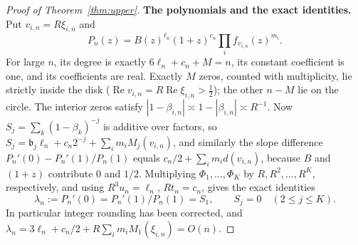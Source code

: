 \documentclass[11pt]{article}
\theoremstyle{remark}\newtheorem{remark}[theorem]{Remark}
\newcommand{\Rea}{\operatorname{Re}}
\begin{document}
\begin{proof}[Proof of Theorem~\ref{thm:upper}]
\textbf{The polynomials and the exact identities.}
Put \(v_{i,n}=R\xi_{i,n}\) and
\[
 P_n(z)=B(z)^{\ell_n}(1+z)^{c_n}\prod_i f_{v_{i,n}}(z)^{m_i}.
\]
For large \(n\), its degree is exactly \(6\ell_n+c_n+M=n\), its constant
coefficient is one, and its coefficients are real. Exactly \(M\)
zeros, counted with multiplicity, lie strictly inside the disk
(\(\Rea v_{i,n}=R\Rea\xi_{i,n}>\frac12\));
the other \(n-M\) lie on the circle. The interior zeros satisfy
\(|1-\beta_{i,n}|\asymp1-|\beta_{i,n}|\asymp R^{-1}\).
Now \(S_j=\sum_k(1-\beta_k)^{-j}\) is additive over factors, so
\(S_j=\mathfrak b_j\ell_n+c_n2^{-j}+\sum_im_iM_j(v_{i,n})\), and similarly the
slope difference \(P_n'(0)-P_n'(1)/P_n(1)\) equals
\(c_n/2+\sum_im_id(v_{i,n})\), because \(B\) and \((1+z)\) contribute
\(0\) and \(1/2\). Multiplying \(\Phi_1,\ldots,\Phi_K\) by
\(R,R^2,\ldots,R^K\), respectively, and using \(R^3u_n=\ell_n\),
\(Rt_n=c_n\), gives the exact identities
\[
 \lambda_n:=P_n'(0)=P_n'(1)/P_n(1)=S_1,\qquad
 S_j=0\quad(2\le j\le K).
\]
In particular integer rounding has been corrected, and
\(\lambda_n=3\ell_n+c_n/2+R\sum_i m_iM_1(\xi_{i,n})=O(n)\).


\end{proof}
\end{document}
